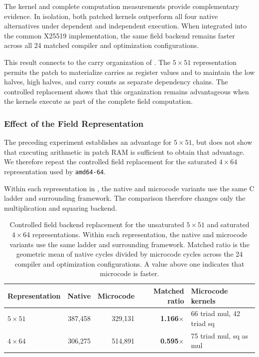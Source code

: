 \documentclass[journal=tches,submission]{iacrtrans}
\begin{document}
The kernel and complete computation measurements provide complementary evidence.
In isolation, both patched kernels outperform all four native alternatives under dependent and independent execution.
When integrated into the common X25519 implementation, the same field backend remains faster across all 24 matched compiler and optimization configurations.

This result connects to the carry organization of .
The $5\times51$ representation permits the patch to materialize carries as register values and to maintain the low halves, high halves, and carry counts as separate dependency chains.
The controlled replacement shows that this organization remains advantageous when the kernels execute as part of the complete field computation.

\subsubsection{Effect of the Field Representation}
\label{sec:c25519-representation-results}

The preceding experiment establishes an advantage for $5\times51$, but does not show that executing arithmetic in patch RAM is sufficient to obtain that advantage.
We therefore repeat the controlled field replacement for the saturated $4\times64$ representation used by \texttt{amd64-64}.

Within each representation in , the native and microcode variants use the same C ladder and surrounding framework.
The comparison therefore changes only the multiplication and squaring backend.

\begin{table}[htbp]
\centering
\caption{Controlled field backend replacement for the unsaturated $5\times51$ and saturated $4\times64$ representations.
Within each representation, the native and microcode variants use the same ladder and surrounding framework.
Matched ratio is the geometric mean of native cycles divided by microcode cycles across the 24 compiler and optimization configurations.
A value above one indicates that microcode is faster.}
\label{tab:res-c25519-representation}
\footnotesize
\setlength{\tabcolsep}{4pt}
\begin{tabular}{@{}lrrrl@{}}
\toprule
Representation & Native & Microcode & Matched ratio & Microcode kernels \\
\midrule
$5\times51$ &
387,458 &
329,131 &
\textbf{1.166$\times$} &
66 triad mul, 42 triad sq \\
$4\times64$ &
306,275 &
514,891 &
\textbf{0.595$\times$} &
75 triad mul, sq as mul \\
\bottomrule
\end{tabular}
\end{table}
\end{document}
